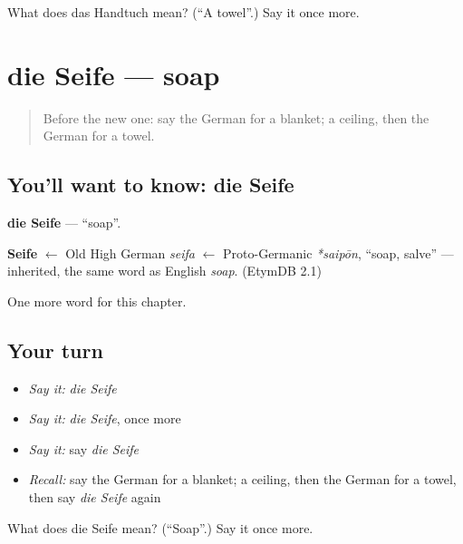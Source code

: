 \begin{tcolorbox}[breakable,colback=teal!4,colframe=teal!35!black,title={Before you move on}]
What does das Handtuch mean? (\textquotedblleft{}A towel\textquotedblright{}.) Say it once more.
\end{tcolorbox}
\section[die Seife]{die Seife — soap}

\label{lesson:GE-C114-seife}



\begin{quote}
Before the new one: say the German for a blanket; a ceiling, then the German for a towel.
\end{quote}

\subsection*{You'll want to know: die Seife}
\textbf{die Seife} — \textquotedblleft{}soap\textquotedblright{}.

\begin{cousinweb}
\textbf{Seife} $\leftarrow$ Old High German \emph{seifa} $\leftarrow$ Proto-Germanic \emph{*saipōn}, \textquotedblleft{}soap, salve\textquotedblright{} — inherited, the same word as English \emph{soap}. (EtymDB 2.1)
\end{cousinweb}

\begin{grammarlens}[title={What you've built}]
One more word for this chapter.
\end{grammarlens}

\subsection*{Your turn}
\begin{itemize}
\raggedright
  \item \emph{Say it:} \emph{die Seife}
  \item \emph{Say it:} \emph{die Seife}, once more
  \item \emph{Say it:} say \emph{die Seife}
  \item \emph{Recall:} say the German for a blanket; a ceiling, then the German for a towel, then say \emph{die Seife} again
\end{itemize}

\begin{tcolorbox}[breakable,colback=teal!4,colframe=teal!35!black,title={Before you move on}]
What does die Seife mean? (\textquotedblleft{}Soap\textquotedblright{}.) Say it once more.
\end{tcolorbox}
